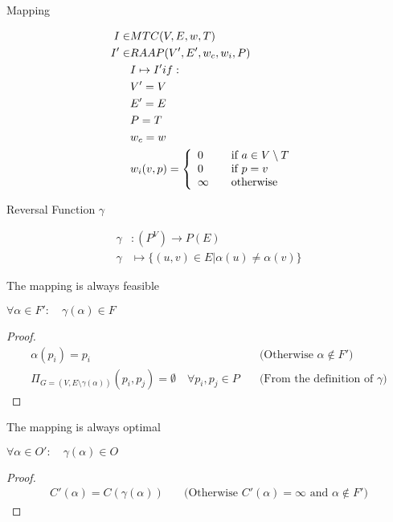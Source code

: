 \documentclass{article}
\begin{document}
\begin{definition}
Mapping

\begin{align}
	\nonumber I \in & MTC(V,E,w,T) &\\
	\nonumber I' \in & RAAP(V', E', w_c, w_i, P) &\\
	\nonumber & I \mapsto I' if: &\\
	\nonumber & V' = V\\
	\nonumber & E' = E\\
	\nonumber & P = T\\
	\nonumber & w_c = w\\
	\nonumber & w_i(v,p) = \mbox{$\left\{ 
		\begin{array}{l l}
			0 & \quad \mbox{if $a \in V \setminus T$}\\
			0 & \quad \mbox{if $p = v$}\\
			\infty & \quad \mbox{otherwise}\\ \end{array} \right.$}
\end{align}
\end{definition}

\begin{definition}
Reversal Function $\gamma$

\begin{align}
	\nonumber \gamma & : (P^V) \rightarrow P(E) \\
	\nonumber \gamma & \mapsto \{(u,v) \in E | \alpha(u) \neq \alpha(v)\}
\end{align}
\end{definition}

\begin{lemma}
The mapping is always feasible

$\forall \alpha \in F' : \quad \gamma(\alpha) \in F$
\end{lemma}

\begin{proof}
\begin{align}
	\nonumber \alpha(p_i) = p_i & \quad \mbox{(Otherwise $\alpha \not\in F'$)} \\
	\nonumber \Pi_{G=(V, E \setminus \gamma(\alpha))} (p_i, p_j) = \emptyset  \quad \forall p_i, p_j \in P & \quad \mbox{(From the definition of $\gamma$)}
\end{align}
\end{proof}

\begin{lemma}
The mapping is always optimal

$\forall \alpha \in O' : \quad \gamma(\alpha) \in O$
\end{lemma}

\begin{proof}
\begin{align}
	\nonumber C'(\alpha) = C(\gamma(\alpha)) & \quad \mbox{(Otherwise $C'(\alpha) = \infty$ and $\alpha \not\in F'$)}
\end{align}
\end{proof}



\end{document}
